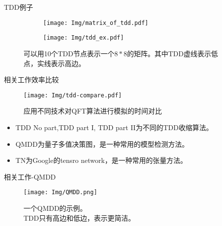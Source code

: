 \documentclass[aspectratio=1610]{ctexbeamer}
\begin{document}
\begin{frame}{TDD例子}
    \begin{figure}
        \begin{subfigure}{0.4\textwidth}
            \texttt{[image: Img/matrix\_of\_tdd.pdf]}
            \label{fig:mat_P}
        \end{subfigure}
        \qquad
        \qquad
        \qquad
        \begin{subfigure}[c]{0.4\textwidth}
            \centering
            \texttt{[image: Img/tdd\_ex.pdf]}
            \label{fig:tdd_P}
        \end{subfigure}
        \label{fig:P}
        \caption{可以用10个TDD节点表示一个$8*8$的矩阵。其中TDD虚线表示低点，实线表示高边。}
    \end{figure}
\end{frame}
\begin{frame}{相关工作效率比较}
    \begin{figure}
        \texttt{[image: Img/tdd-compare.pdf]}
        \caption{应用不同技术对QFT算法进行模拟的时间对比}
    \end{figure}
    \begin{center}
        \begin{itemize}
        
            \item TDD No part,TDD part I, TDD part II为不同的TDD收缩算法。 
            \item QMDD为量子多值决策图，是一种常用的模型检测方法。
            \item TN为Google的tensro network，是一种常用的张量方法。
        \end{itemize}
    \end{center}
\end{frame}
\begin{frame}{相关工作-QMDD}
    \begin{figure}
      \texttt{[image: Img/QMDD.png]}
      \caption{一个QMDD的示例。\\ TDD只有高边和低边，表示更简洁。}
    \end{figure}
  \end{frame}
\end{document}
